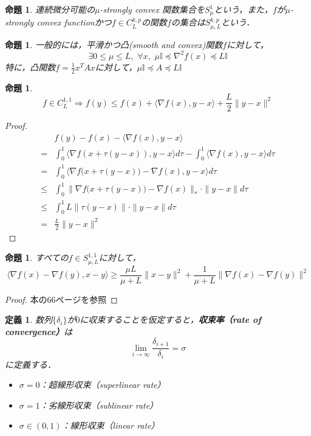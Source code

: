 \documentclass[a4paper,11pt]{jsarticle}
\newtheorem{prop}[theorem]{命題}
\newtheorem{definition}[theorem]{定義}
\numberwithin{theorem}{section}  %
\numberwithin{equation}{section} %
\begin{document}
\begin{prop}
連続微分可能の$\mu$-strongly convex 関数集合を$S_\mu^1$という，また，$f$が$\mu$-strongly convex functionかつ$f \in C_L^{k,p}$の関数$f$の集合は$S_{\mu,L}^{k,p}$という．
\end{prop}
\begin{prop}
一般的には，平滑かつ凸(smooth and convex)関数$f$に対して，
\begin{equation}
\exists 0 \le \mu \le L,\,\, \forall x,\,\, \mu \mathbb{I} \preceq \nabla^2f(x) \preceq L \mathbb{I}
\end{equation}
特に，凸関数$f = \frac{1}{2}x^TAx$に対して，$\mu \mathbb{I} \preceq A \preceq L\mathbb{I}$
\end{prop}
\begin{prop}
\label{l-prop}
\begin{equation}
f \in C_{L}^{1,1} \Rightarrow f(y) \le f(x) + \langle \nabla f(x), y-x \rangle + \frac{L}{2}\| y-x \|^2
\end{equation}
\end{prop}
\begin{proof}
\begin{equation}
\begin{split}
& f(y) - f(x) - \langle \nabla f(x), y-x \rangle \\
= & \int_0^1 \langle \nabla f(x+\tau(y-x)),y-x \rangle d\tau - \int_0^1 \langle \nabla f(x), y-x \rangle d\tau \\
= &  \int_0^1 \langle \nabla f \big( x + \tau ( y-x) \big) - \nabla f(x),y-x \rangle d\tau \\
\le & \int_0^1 \| \nabla f \big( x + \tau ( y-x) \big) - \nabla f(x) \|_* \cdot \| y-x \| d\tau \\
\le & \int_0^1 L\|  \tau ( y-x) \| \cdot \| y-x \| d\tau \\
= & \frac{L}{2} \| y-x \|^2
\end{split}
\end{equation}
\end{proof}
\begin{prop}
すべての$f \in S_{\mu,L}^{1,1}$に対して，
\begin{equation}
\langle \nabla f(x) - \nabla f(y), x-y \rangle \ge \frac{\mu L}{\mu + L}\| x-y \|^2 + \frac{1}{\mu + L}\| \nabla f(x) - \nabla f(y) \|^2 \label{2.1.24}
\end{equation}
\end{prop}
\begin{proof}
本\cite{iloco}の66ページを参照
\end{proof}
\begin{definition}
数列$\{\delta_i\}$が$0$に収束することを仮定すると，{\bf 収束率（rate of convergence）}は
\begin{equation}
\lim_{i \to \infty} \frac{\delta_{i+1}}{\delta_i}=\sigma
\end{equation}
に定義する．
\begin{itemize}
\item $\sigma = 0$：超線形収束（superlinear rate）
\item $\sigma = 1$：劣線形収束（sublinear rate）
\item $\sigma \in (0,1)$：線形収束（linear rate）
\end{itemize}
\end{definition}
\end{document}
